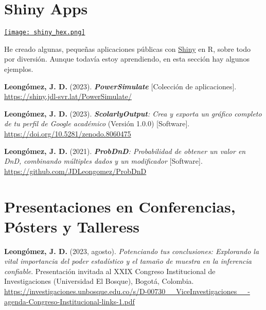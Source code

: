 \documentclass[11pt,a4paper,]{awesome-cv}
\begin{document}
\hypertarget{shiny-apps}{%
\section{Shiny Apps}\label{shiny-apps}}

\begin{minipage}[c]{0.10\linewidth}
\href{https://jdleongomez.info/es/#shiny}{\texttt{[image: shiny\_hex.png]}}
\end{minipage} \begin{minipage}[c]{0.90\linewidth}
He creado algunas, pequeñas aplicaciones públicas con \href{https://shiny.posit.co/}{Shiny} en R, sobre todo por diversión. Aunque todavía estoy aprendiendo, en esta sección hay algunos ejemplos.
\end{minipage}

\begingroup
\footnotesize
\setlength{\parindent}{-0.5in}
\setlength{\leftskip}{0.5in}

\textbf{Leongómez, J. D.} (2023). \textbf{\emph{PowerSimulate}}
{[}Colección de aplicaciones{]}.
\url{https://shiny.jdl-svr.lat/PowerSimulate/}

\textbf{Leongómez, J. D.} (2023). \emph{\textbf{ScolarlyOutput}: Crea y
exporta un gráfico completo de tu perfil de Google académico} (Versión
1.0.0) {[}Software{]}.
\href{https://github.com/JDLeongomez/ScholarlyOutput_ES}{https://doi.org/10.5281/zenodo.8060475}

\textbf{Leongómez, J. D.} (2021). \emph{\textbf{ProbDnD}: Probabilidad
de obtener un valor en DnD, combinando múltiples dados y un modificador}
{[}Software{]}. \url{https://github.com/JDLeongomez/ProbDnD}

\endgroup

\hypertarget{presentaciones-en-conferencias-puxf3sters-y-talleress}{%
\section{Presentaciones en Conferencias, Pósters y
Talleress}\label{presentaciones-en-conferencias-puxf3sters-y-talleress}}

\begingroup
\footnotesize
\setlength{\parindent}{-0.5in}
\setlength{\leftskip}{0.5in}

\textbf{Leongómez, J. D.} (2023, agosto). \emph{Potenciando tus
conclusiones: Explorando la vital importancia del poder estadístico y el
tamaño de muestra en la inferencia confiable}. Presentación invitada al
XXIX Congreso Institucional de Investigaciones (Universidad El Bosque),
Bogotá, Colombia.
\url{https://investigaciones.unbosque.edu.co/s/D-00730__ViceInvestigaciones__-agenda-Congreso-Institucional-links-1.pdf}
\end{document}

